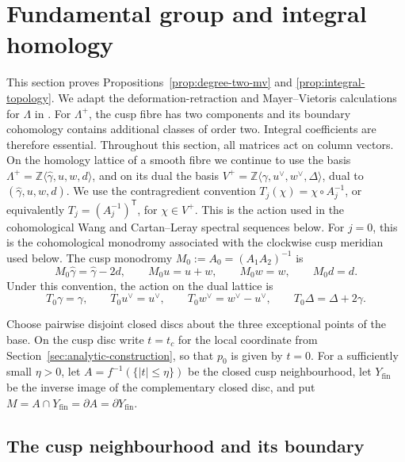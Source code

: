 \section{Fundamental group and integral homology}\label{sec:topology}

This section proves Propositions~\ref{prop:degree-two-mv} and
\ref{prop:integral-topology}.
We adapt the deformation-retraction and Mayer--Vietoris calculations for
$\Lambda$ in
\citep[Sections~7.1--7.6 and Appendix~A]{Alpoge2026}.  For $\Lambda^+$,
the cusp fibre has two components and its boundary cohomology contains
additional classes of order two.  Integral coefficients are therefore
essential.
Throughout this section, all matrices act on column vectors.
On the homology lattice of a smooth fibre we continue to use the basis
$\Lambda^+=\mathbb Z\langle \widehat\gamma,u,w,d\rangle$,
and on its dual the basis
$V^+=\mathbb Z\langle\gamma,u^\vee,w^\vee,\Delta\rangle$, dual to
$(\widehat\gamma,u,w,d)$.  We use the contragredient convention
$T_j(\chi)=\chi\circ A_j^{-1}$, or equivalently
$T_j=(A_j^{-1})^{\mathsf T}$, for $\chi\in V^+$.
This is the action used in the cohomological Wang and Cartan--Leray spectral
sequences below.
For $j=0$, this is the cohomological monodromy associated with the clockwise
cusp meridian used below.  The cusp monodromy
$M_0:=A_0=(A_1A_2)^{-1}$ is
\begin{equation}\label{eq:cusp-monodromy-homology}
 M_0\widehat\gamma=\widehat\gamma-2d,\qquad
 M_0u=u+w,\qquad M_0w=w,\qquad M_0d=d.
\end{equation}
Under this convention, the action on the dual lattice is
\begin{equation}\label{eq:cusp-monodromy-cohomology}
 T_0\gamma=\gamma,\qquad T_0u^\vee=u^\vee,\qquad
 T_0w^\vee=w^\vee-u^\vee,\qquad T_0\Delta=\Delta+2\gamma.
\end{equation}%

Choose pairwise disjoint closed discs about the three exceptional points of
the base.  On the cusp disc write $t=t_c$ for the local coordinate from
Section~\ref{sec:analytic-construction}, so that $p_0$ is given by $t=0$.
For a sufficiently small $\eta>0$, let
$A=f^{-1}(\{|t|\leq\eta\})$ be the closed cusp neighbourhood, let
$Y_{\mathrm{fin}}$ be the inverse
image of the complementary closed disc, and put
$M=A\cap Y_{\mathrm{fin}}=\partial A=\partial Y_{\mathrm{fin}}$.

\subsection{The cusp neighbourhood and its boundary}

